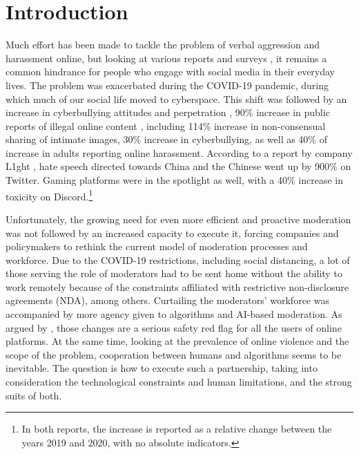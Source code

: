 \documentclass[preprint,12pt]{elsarticle}
\begin{document}
\tableofcontents




\section{Introduction}\label{introduction}

Much effort has been made to tackle the problem of verbal aggression and harassment online, but looking at various reports and surveys \citep{Zachary_hate, sorrentino2019epidemiology, vogels_state_2021}, it remains a common hindrance for people who engage with social media in their everyday lives. The problem was exacerbated during the COVID-19 pandemic, during which much of our social life moved to cyberspace. This shift was followed by an increase in cyberbullying attitudes and perpetration \citep{barlett2021comparing}, 90\% increase in public reports of illegal online content \citep{grant_2021}, including 114\% increase in non-consensual sharing of intimate images, 30\% increase in cyberbullying, as well as 40\% of increase in adults reporting online harassment. According to a report by company L1ght \citep{noauthor_l1ght_2020}, hate speech directed towards China and the Chinese went up by 900\% on Twitter. Gaming platforms were in the spotlight as well, with a 40\% increase in toxicity on Discord.\footnote{In both reports, the increase is reported as a relative change between the years 2019 and 2020, with no absolute indicators.}

Unfortunately, the growing need for even more efficient and proactive moderation was not followed by an increased capacity to execute it, forcing companies and policymakers to rethink the current model of moderation processes and workforce. Due to the COVID-19 restrictions, including social distancing, a lot of those serving the role of moderators had to be sent home \citep{bhattacharya} without the ability to work remotely because of the constraints affiliated with restrictive non-disclosure agreements (NDA), among others. Curtailing the moderators’ workforce was accompanied by more agency given to algorithms and AI-based moderation. As argued by \citet{gerrard2020covid19}, those changes are a serious safety red flag for all the users of online platforms. At the same time, looking at the prevalence of online violence and the scope of the problem, cooperation between humans and algorithms seems to be inevitable. The question is how to execute such a partnership, taking into consideration the technological constraints and human limitations, and the strong suits of both.
\end{document}
